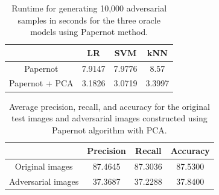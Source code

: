\begin{table} 
\centering
\begin{tabular}{c|ccc}
\toprule
&LR & SVM & kNN \\
\midrule
Papernot & 7.9147 & 7.9776 & 8.57\\
Papernot + PCA & 3.1826 & 3.0719 & 3.3997\\
\bottomrule
\end{tabular}
   \caption{Runtime for generating 10,000 adversarial samples in seconds for the three oracle models using Papernot method.}
   \label{runtime_Papernot}
\end{table}

\begin{table}
\centering
\begin{tabular}{c|ccc}
\toprule
&Precision & Recall & Accuracy \\
\midrule
Original images & 87.4645 &  87.3036  & 87.5300 \\
Adversarial images & 37.3687 &  37.2288 &  37.8400\\
\bottomrule
\end{tabular}
   \caption{Average precision, recall, and accuracy for the original test images and adversarial images constructed using Papernot algorithm with PCA.}
   \label{tablewithstuff}
\end{table}

